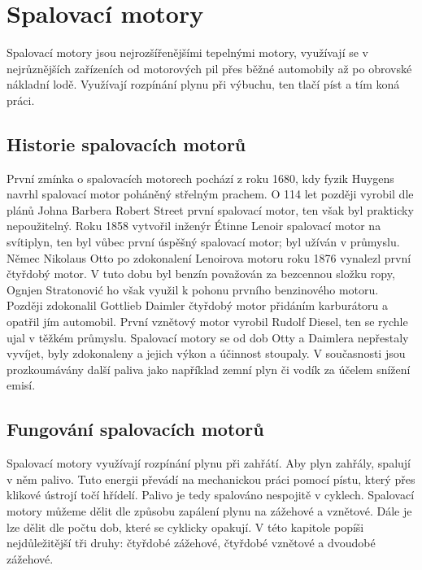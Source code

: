 \section{Spalovací motory}
{Spalovací motory jsou nejrozšířenějšími tepelnými motory, využívají se v nejrůznějších zařízeních od motorových pil přes běžné automobily až po obrovské nákladní lodě. Využívají rozpínání plynu při výbuchu, ten tlačí píst a tím koná práci.}
\subsection{Historie spalovacích motorů}\label{sc:HistorieSpalovacichMotoru}
{První zmínka o spalovacích motorech pochází z roku 1680, kdy fyzik Huygens navrhl spalovací motor poháněný střelným prachem. O 114 let později vyrobil dle plánů Johna Barbera Robert Street první spalovací motor, ten však byl prakticky nepoužitelný. Roku 1858 vytvořil inženýr Étinne Lenoir spalovací motor na svítiplyn, ten byl vůbec první úspěšný spalovací motor; byl užíván v průmyslu.}
\cite{vutb:vyzkumneSpalovaciMotory}\cite{ANNALS:TheHistoryOfTheInternalCombustionEngine}\odst
{Němec Nikolaus Otto po zdokonalení Lenoirova motoru roku 1876 vynalezl první čtyřdobý motor. V tuto dobu byl benzín považován za bezcennou složku ropy, Ognjen Stratonović ho však využil k pohonu prvního benzinového motoru. Později zdokonalil Gottlieb Daimler čtyřdobý motor přidáním karburátoru a opatřil jím automobil. První vznětový motor vyrobil Rudolf Diesel, ten se rychle ujal v těžkém průmyslu.}
\cite{vutb:vyzkumneSpalovaciMotory}\cite{ANNALS:TheHistoryOfTheInternalCombustionEngine}\odst
{Spalovací motory se od dob Otty a Daimlera nepřestaly vyvíjet, byly zdokonaleny a jejich výkon a účinnost stoupaly. V současnosti jsou prozkoumávány další paliva jako například zemní plyn či vodík za účelem snížení emisí.}
\cite{vutb:vyzkumneSpalovaciMotory}
\subsection{Fungování spalovacích motorů}
{Spalovací motory využívají rozpínání plynu při zahřátí. Aby plyn zahřály, spalují v něm palivo. Tuto energii převádí na mechanickou práci pomocí pístu, který přes klikové ústrojí točí hřídelí. Palivo je tedy spalováno nespojitě v cyklech.}\odst
{Spalovací motory můžeme dělit dle způsobu zapálení plynu na zážehové a vznětové. Dále je lze dělit dle počtu dob, které se cyklicky opakují. V této kapitole popíši nejdůležitější tři druhy: čtyřdobé zážehové, čtyřdobé vznětové a dvoudobé zážehové.}
\cite{vutb:vyzkumneSpalovaciMotory}
\newpage
